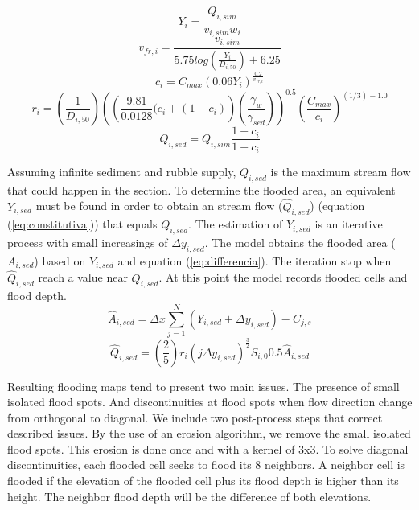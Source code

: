 {\begin{equation}
 Y_i = \frac{Q_{i,sim}}{v_{i,sim} w_{i}}
 \label{eq:altura}
\end{equation}
\begin{equation}
 v_{fr,i} = \frac{v_{i,sim}}{5.75 log \left( \frac{Y_{i}}{D_{i,50}} \right) + 6.25}
 \label{eq:velocidad}
\end{equation}
\begin{equation}
 c_{i} = C_{max} (0.06 Y_{i})^{\frac{0.2}{v_{fr,i}}}
 \label{eq:con}
\end{equation}
\begin{equation}
 r_{i} = \left( \frac{1}{D_{i,50}} \right) \left(  \left( \frac{9.81}{0.0128} (c_i + (1-c_i) \right)  \left( \frac{\gamma_w}{\gamma_{sed} }\right)   \right)^{0.5} \left( \frac{C_{max}}{c_i} \right)^{(1/3)-1.0}
 \label{eq:rdf}
\end{equation}
\begin{equation}
 Q_{i,sed} = Q_{i,sim} \frac{1+c_i}{1-c_i}
 \label{eq:qescombros}
\end{equation}
 
Assuming infinite sediment and rubble supply, $Q_{i,sed}$ is the maximum stream flow that could happen in the section.  To determine the flooded area, an equivalent $Y_{i,sed}$ must be found in order to obtain an stream flow ($\hat{Q}_{{i,sed}}$) (equation (\ref{eq:constitutiva})) that equals $Q_{i,sed}$.  The estimation of $Y_{i,sed}$ is an iterative process with small increasings of $\Delta y_{i,sed}$.  The model obtains the flooded area ($A_{i,sed}$) based on $Y_{i,sed}$ and equation (\ref{eq:differencia}).  The iteration stop when $\hat{Q}_{i,sed}$ reach a value near $Q_{i,sed}$.  At this point the model records flooded cells and flood depth.\\ 
 
 \begin{equation}
  \hat{A}_{i,sed} = \Delta x \sum_{j=1}^{N} (Y_{i,sed}+\Delta y_{i,sed}) - C_{j,s} 
  \label{eq:differencia}
 \end{equation}
 \begin{equation}
   \hat{Q}_{i,sed} = \left( \frac{2}{5} \right) r_i(j \Delta y_{i,sed})^{\frac{3}{2}} S_{i,0} 0.5 \hat{A}_{i,sed} 
 \label{eq:constitutiva} 
 \end{equation}

Resulting flooding maps tend to present two main issues.  The presence of small isolated flood spots. And discontinuities at flood spots when flow direction change from orthogonal to diagonal.  We include two post-process steps that correct described issues.  By the use of an erosion algorithm, we remove the small isolated flood spots. This erosion is done once and with a kernel of 3x3.  To solve diagonal discontinuities, each flooded cell seeks to flood its 8 neighbors.  A neighbor cell is flooded if the elevation of the flooded cell plus its flood depth is higher than its height.  The neighbor flood depth will be the difference of both elevations.\\ 
}
